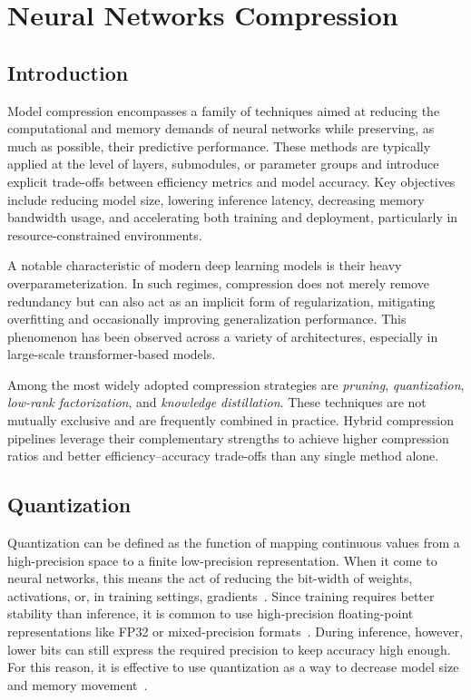 \chapter{Neural Networks Compression}
\label{chap:compression}
\section{Introduction}
Model compression encompasses a family of techniques aimed at reducing the computational and memory demands of neural networks while preserving, as much as possible, their predictive performance. These methods are typically applied at the level of layers, submodules, or parameter groups and introduce explicit trade-offs between efficiency metrics and model accuracy. Key objectives include reducing model size, lowering inference latency, decreasing memory bandwidth usage, and accelerating both training and deployment, particularly in resource-constrained environments.

A notable characteristic of modern deep learning models is their heavy overparameterization. In such regimes, compression does not merely remove redundancy but can also act as an implicit form of regularization, mitigating overfitting and occasionally improving generalization performance. This phenomenon has been observed across a variety of architectures, especially in large-scale transformer-based models.

Among the most widely adopted compression strategies are \emph{pruning}, \emph{quantization}, \emph{low-rank factorization}, and \emph{knowledge distillation}. These techniques are not mutually exclusive and are frequently combined in practice. Hybrid compression pipelines leverage their complementary strengths to achieve higher compression ratios and better efficiency–accuracy trade-offs than any single method alone.

\section{Quantization}
\label{sec:quant_fundamentals}

Quantization can be defined as the function of mapping continuous values from a high-precision space to a finite low-precision representation. When it come to  neural networks, this means the act of reducing the bit-width of weights, activations, or, in training settings, gradients~\cite{gholami2022survey}. Since training requires better stability than inference, it is common to use high-precision floating-point representations like FP32 or mixed-precision formats~\cite{krishnamoorthi2018quantizing}. During inference, however, lower bits can still express the required precision to keep accuracy high enough. For this reason, it is effective to use quantization as a way to decrease model size and memory movement~\cite{han2016eie}.

